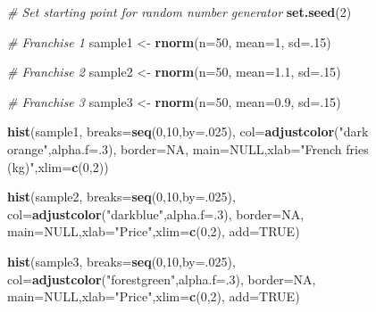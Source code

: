 \documentclass[
]{book}
\newenvironment{Shaded}{\begin{snugshade}}{\end{snugshade}}
\newcommand{\CommentTok}[1]{\textcolor[rgb]{0.56,0.35,0.01}{\textit{#1}}}
\newcommand{\DataTypeTok}[1]{\textcolor[rgb]{0.13,0.29,0.53}{#1}}
\newcommand{\DecValTok}[1]{\textcolor[rgb]{0.00,0.00,0.81}{#1}}
\newcommand{\FloatTok}[1]{\textcolor[rgb]{0.00,0.00,0.81}{#1}}
\newcommand{\KeywordTok}[1]{\textcolor[rgb]{0.13,0.29,0.53}{\textbf{#1}}}
\newcommand{\NormalTok}[1]{#1}
\newcommand{\OtherTok}[1]{\textcolor[rgb]{0.56,0.35,0.01}{#1}}
\newcommand{\StringTok}[1]{\textcolor[rgb]{0.31,0.60,0.02}{#1}}
\begin{document}
\begin{Shaded}
\begin{Highlighting}[]
\CommentTok{# Set starting point for random number generator}
\KeywordTok{set.seed}\NormalTok{(}\DecValTok{2}\NormalTok{)}

\CommentTok{# Franchise 1}
\NormalTok{sample1 <-}\StringTok{ }\KeywordTok{rnorm}\NormalTok{(}\DataTypeTok{n=}\DecValTok{50}\NormalTok{, }\DataTypeTok{mean=}\DecValTok{1}\NormalTok{, }\DataTypeTok{sd=}\NormalTok{.}\DecValTok{15}\NormalTok{)}

\CommentTok{# Franchise 2}
\NormalTok{sample2 <-}\StringTok{ }\KeywordTok{rnorm}\NormalTok{(}\DataTypeTok{n=}\DecValTok{50}\NormalTok{, }\DataTypeTok{mean=}\FloatTok{1.1}\NormalTok{, }\DataTypeTok{sd=}\NormalTok{.}\DecValTok{15}\NormalTok{)}

\CommentTok{# Franchise 3}
\NormalTok{sample3 <-}\StringTok{ }\KeywordTok{rnorm}\NormalTok{(}\DataTypeTok{n=}\DecValTok{50}\NormalTok{, }\DataTypeTok{mean=}\FloatTok{0.9}\NormalTok{, }\DataTypeTok{sd=}\NormalTok{.}\DecValTok{15}\NormalTok{)}

\KeywordTok{hist}\NormalTok{(sample1,}
     \DataTypeTok{breaks=}\KeywordTok{seq}\NormalTok{(}\DecValTok{0}\NormalTok{,}\DecValTok{10}\NormalTok{,}\DataTypeTok{by=}\NormalTok{.}\DecValTok{025}\NormalTok{),}
     \DataTypeTok{col=}\KeywordTok{adjustcolor}\NormalTok{(}\StringTok{"dark orange"}\NormalTok{,}\DataTypeTok{alpha.f=}\NormalTok{.}\DecValTok{3}\NormalTok{),}
     \DataTypeTok{border=}\OtherTok{NA}\NormalTok{,}
     \DataTypeTok{main=}\OtherTok{NULL}\NormalTok{,}\DataTypeTok{xlab=}\StringTok{"French fries (kg)"}\NormalTok{,}\DataTypeTok{xlim=}\KeywordTok{c}\NormalTok{(}\DecValTok{0}\NormalTok{,}\DecValTok{2}\NormalTok{))}

\KeywordTok{hist}\NormalTok{(sample2,}
     \DataTypeTok{breaks=}\KeywordTok{seq}\NormalTok{(}\DecValTok{0}\NormalTok{,}\DecValTok{10}\NormalTok{,}\DataTypeTok{by=}\NormalTok{.}\DecValTok{025}\NormalTok{),}
     \DataTypeTok{col=}\KeywordTok{adjustcolor}\NormalTok{(}\StringTok{"darkblue"}\NormalTok{,}\DataTypeTok{alpha.f=}\NormalTok{.}\DecValTok{3}\NormalTok{),}
     \DataTypeTok{border=}\OtherTok{NA}\NormalTok{,}
     \DataTypeTok{main=}\OtherTok{NULL}\NormalTok{,}\DataTypeTok{xlab=}\StringTok{"Price"}\NormalTok{,}\DataTypeTok{xlim=}\KeywordTok{c}\NormalTok{(}\DecValTok{0}\NormalTok{,}\DecValTok{2}\NormalTok{),}
     \DataTypeTok{add=}\OtherTok{TRUE}\NormalTok{)}

\KeywordTok{hist}\NormalTok{(sample3,}
     \DataTypeTok{breaks=}\KeywordTok{seq}\NormalTok{(}\DecValTok{0}\NormalTok{,}\DecValTok{10}\NormalTok{,}\DataTypeTok{by=}\NormalTok{.}\DecValTok{025}\NormalTok{),}
     \DataTypeTok{col=}\KeywordTok{adjustcolor}\NormalTok{(}\StringTok{"forestgreen"}\NormalTok{,}\DataTypeTok{alpha.f=}\NormalTok{.}\DecValTok{3}\NormalTok{),}
     \DataTypeTok{border=}\OtherTok{NA}\NormalTok{,}
     \DataTypeTok{main=}\OtherTok{NULL}\NormalTok{,}\DataTypeTok{xlab=}\StringTok{"Price"}\NormalTok{,}\DataTypeTok{xlim=}\KeywordTok{c}\NormalTok{(}\DecValTok{0}\NormalTok{,}\DecValTok{2}\NormalTok{),}
     \DataTypeTok{add=}\OtherTok{TRUE}\NormalTok{)}
\end{Highlighting}
\end{Shaded}
\end{document}
